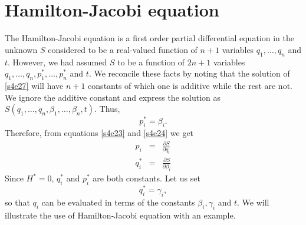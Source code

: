 \documentclass{article}
\newcommand{\pd}[2]{\frac{\partial{#1}}{\partial{#2}}}
\numberwithin{equation}{section}
\theoremstyle{plain}
\numberwithin{thm}{section}
\theoremstyle{plain}
\numberwithin{prop}{section}
\theoremstyle{definition}
\numberwithin{defn}{section}
\theoremstyle{remark}
\begin{document}
\section{Hamilton-Jacobi equation}\label{s5}
The Hamilton-Jacobi equation is a first order partial differential equation
in the unknown $S$ considered to be a real-valued function of $n+1$ variables
$q_1, \ldots, q_n$ and $t$. However, we had assumed $S$ to be a function of
$2n + 1$ variables $q_1, \ldots, q_n, p_1^\ast, \ldots, p_n^\ast$ and $t$.
We reconcile these facts by noting that the solution of \eqref{s4e27} will
have $n + 1$ constants of which one is additive while the rest are not. We
ignore the additive constant and express the solution as $S(q_1, \ldots, q_n,
\beta_1, \ldots, \beta_n, t)$. Thus,
\begin{equation}\label{s5e1}
p_i^\ast = \beta_i.
\end{equation}
Therefore, from equations \eqref{s4e23} and \eqref{s4e24} we get
\begin{eqnarray}
p_i &=& \pd{S}{q_i} \label{s5e2} \\
q_i^\ast &=& \pd{S}{\beta_i} \label{s5e3}
\end{eqnarray}
Since $H^\ast = 0$, $q_i^\ast$ and $p_i^\ast$ are both constants. Let us set
\begin{equation}\label{s5e4}
q_i^\ast = \gamma_i,
\end{equation}
so that $q_i$ can be evaluated in terms of the constants $\beta_i, \gamma_i$ 
and $t$. We will illustrate the use of Hamilton-Jacobi equation with an example.
\end{document}
